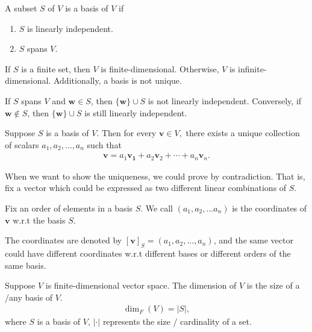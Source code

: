 \documentclass[12pt]{article}
\begin{document}
\begin{definition}[Basis]
    A subset $S$ of $V$ is a basis of $V$ if
    \begin{enumerate}
        \item $S$ is linearly independent.
        \item $S$ spans $V$.
    \end{enumerate}
\end{definition}
If $S$ is a finite set, then $V$ is finite-dimensional.
Otherwise, $V$ is infinite-dimensional.
Additionally, a basis is not unique.


\begin{pbox}
\begin{remark}
 If $S$ spans $V$ and $\mathbf{w}\in S$, then $\{\mathbf{w}\}\cup S$ is not linearly independent.
 Conversely, if $\mathbf{w}\notin S$, then $\{\mathbf{w}\}\cup S$ is still linearly independent.
\end{remark}
\end{pbox}



\begin{theorem}
    Suppose $S$ is a basis of $V$.
    Then for every $\mathbf{v}\in V,$ there exists a unique collection of scalars $a_1,a_2,\ldots,a_n$ such that
    \begin{align*}
        \mathbf{v}=a_1\mathbf{v_1}+a_2\mathbf{v}_2+\cdots+a_n\mathbf{v}_n.  
    \end{align*}
\end{theorem}

\begin{pfbox}
When we want to show the uniqueness, we could prove by contradiction.
That is, fix a vector which could be expressed as two different linear combinations of $S$.
\end{pfbox}


\begin{definition}
    Fix an order of elements in a basis $S$.
    We call $(a_1,a_2,\ldots a_n)$ is the coordinates of $\mathbf{v}$ w.r.t the basis $S$.
\end{definition}

The coordinates are denoted by $[\mathbf{v}]_S = (a_1,a_2,\ldots, a_n)$,
and the same vector could have different coordinates w.r.t different bases or
different orders of the same basis.


\begin{definition}[Dimension]
    Suppose $V$ is finite-dimensional vector space.
    The dimension of $V$ is the size of a /any basis of $V$.
    \begin{align*}
        \dim_F(V) = |S|,
    \end{align*}
where $S$ is a basis of $V$, $|\cdot|$ represents the size / cardinality of a set.
\end{definition}
\end{document}
